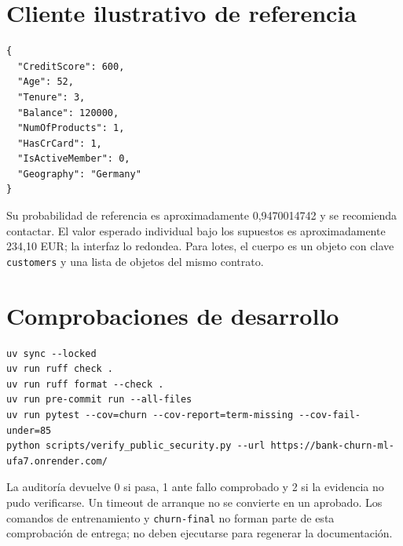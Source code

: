 \documentclass[11pt,a4paper,oneside]{report}
\begin{document}
\section{Cliente ilustrativo de referencia}
\begin{lstlisting}
{
  "CreditScore": 600,
  "Age": 52,
  "Tenure": 3,
  "Balance": 120000,
  "NumOfProducts": 1,
  "HasCrCard": 1,
  "IsActiveMember": 0,
  "Geography": "Germany"
}
\end{lstlisting}
Su probabilidad de referencia es aproximadamente 0,9470014742 y se recomienda
contactar. El valor esperado individual bajo los supuestos es aproximadamente
234,10 EUR; la interfaz lo redondea. Para lotes, el cuerpo es un objeto con
clave \texttt{customers} y una lista de objetos del mismo contrato.

\section{Comprobaciones de desarrollo}
\begin{lstlisting}
uv sync --locked
uv run ruff check .
uv run ruff format --check .
uv run pre-commit run --all-files
uv run pytest --cov=churn --cov-report=term-missing --cov-fail-under=85
python scripts/verify_public_security.py --url https://bank-churn-ml-ufa7.onrender.com/
\end{lstlisting}
La auditoría devuelve 0 si pasa, 1 ante fallo comprobado y 2 si la evidencia
no pudo verificarse. Un timeout de arranque no se convierte en un aprobado.
Los comandos de entrenamiento y \texttt{churn-final} no forman parte de esta
comprobación de entrega; no deben ejecutarse para regenerar la documentación.
\end{document}
